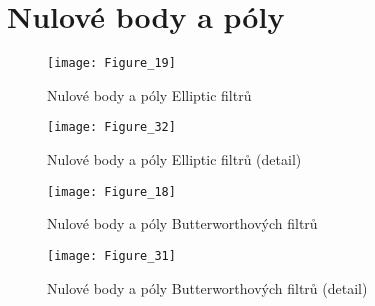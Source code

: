 \section{Nulové body a póly}
\begin{figure}[H] 
	\centering
	\texttt{[image: Figure\_19]}
	\caption{Nulové body a póly Elliptic filtrů}
\end{figure}

\begin{figure}[H] 
	\centering
	\texttt{[image: Figure\_32]}
	\caption{Nulové body a póly Elliptic filtrů (detail)}
\end{figure}

\begin{figure}[H] 
	\centering
	\texttt{[image: Figure\_18]}
	\caption{Nulové body a póly Butterworthových filtrů}
\end{figure}

\begin{figure}[H] 
	\centering
	\texttt{[image: Figure\_31]}
	\caption{Nulové body a póly Butterworthových filtrů (detail)}
\end{figure}